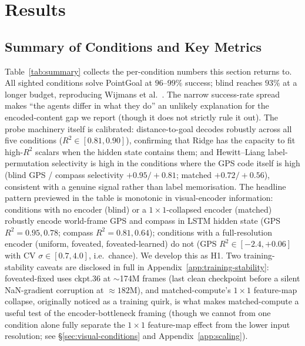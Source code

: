 \documentclass{article}
\begin{document}
\section{Results}
\label{sec:results}

\subsection{Summary of Conditions and Key Metrics}
\label{sec:summary}

Table~\ref{tab:summary} collects the per-condition numbers this section returns to. All sighted conditions solve PointGoal at $96$--$99\%$ success; blind reaches $93\%$ at a longer budget, reproducing Wijmans et al.~\citep{wijmans2023emergence}. The narrow success-rate spread makes ``the agents differ in what they do'' an unlikely explanation for the encoded-content gap we report (though it does not strictly rule it out). The probe machinery itself is calibrated: distance-to-goal decodes robustly across all five conditions ($R^2 \in [0.81, 0.90]$), confirming that Ridge has the capacity to fit high-$R^2$ scalars when the hidden state contains them; and Hewitt--Liang label-permutation selectivity is high in the conditions where the GPS code itself is high (blind GPS / compass selectivity $+0.95 / +0.81$; matched $+0.72 / +0.56$), consistent with a genuine signal rather than label memorisation. The headline pattern previewed in the table is monotonic in visual-encoder information: conditions with no encoder (blind) or a $1{\times}1$-collapsed encoder (matched) robustly encode world-frame GPS and compass in LSTM hidden state (GPS $R^2 = 0.95, 0.78$; compass $R^2 = 0.81, 0.64$); conditions with a full-resolution encoder (uniform, foveated, foveated-learned) do not (GPS $R^2 \in [-2.4, +0.06]$ with CV $\sigma \in [0.7, 4.0]$, i.e.\ chance). We develop this as H1. Two training-stability caveats are disclosed in full in Appendix~\ref{app:training-stability}: foveated-fixed uses ckpt.36 at $\sim$174M frames (last clean checkpoint before a silent NaN-gradient corruption at $\approx\!182$M), and matched-compute's $1{\times}1$ feature-map collapse, originally noticed as a training quirk, is what makes matched-compute a useful test of the encoder-bottleneck framing (though we cannot from one condition alone fully separate the $1{\times}1$ feature-map effect from the lower input resolution; see §\ref{sec:visual-conditions} and Appendix~\ref{app:scaling}).
\end{document}
